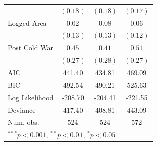 \documentclass[12pt,]{book}
\let\origtable\table
\let\endorigtable\endtable
\renewenvironment{table}[1][2] {
    \singlespacing
    \expandafter\origtable\expandafter[H]
} {
    \endorigtable
}
\theoremstyle{definition}
\theoremstyle{definition}
\theoremstyle{definition}
\theoremstyle{remark}
\begin{document}
\begin{table}
\begin{center}
\begin{tabular}{l c c c }
                                        & $(0.18)$     & $(0.18)$     & $(0.17)$     \\
Logged Area                             & $0.02$       & $0.08$       & $0.06$       \\
                                        & $(0.13)$     & $(0.13)$     & $(0.12)$     \\
Post Cold War                           & $0.45$       & $0.41$       & $0.51$       \\
                                        & $(0.27)$     & $(0.28)$     & $(0.27)$     \\
\hline
AIC                                     & 441.40       & 434.81       & 469.09       \\
BIC                                     & 492.54       & 490.21       & 525.63       \\
Log Likelihood                          & -208.70      & -204.41      & -221.55      \\
Deviance                                & 417.40       & 408.81       & 443.09       \\
Num. obs.                               & 524          & 524          & 572          \\
\hline
\multicolumn{4}{l}{\scriptsize{$^{***}p<0.001$, $^{**}p<0.01$, $^*p<0.05$}}
\end{tabular}
\caption{Logit Models of Multi-Rebel Conflict-Years (Central Gov Conflicts Only)}
\label{tab:combined-gov}
\end{center}
\end{table}
\end{document}

